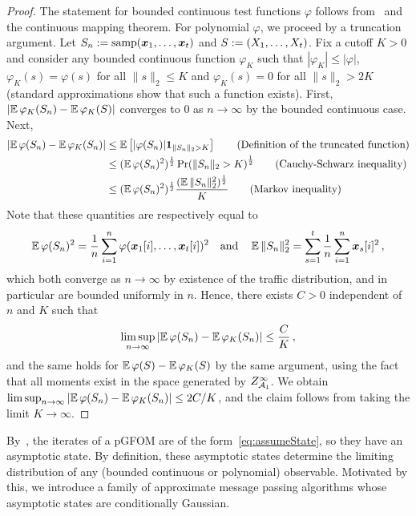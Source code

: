 \begin{proof}
    The statement for bounded continuous test
    functions $\varphi$ follows from~ and
    the continuous mapping theorem.
    For polynomial $\varphi$, we proceed by a truncation argument.
    Let $S_n := \mathrm{samp}(\bm x_1, \ldots, \bm x_t)$ and $S := (X_1, \ldots, X_t)$. Fix a cutoff $K>0$ and consider
    any bounded continuous function $\varphi_K$ such
    that $|\varphi_K|\le |\varphi|$, $\varphi_K(s) = \varphi(s)$ for all
    $\|s\|_2\le K$ and $\varphi_K(s)=0$ for all
    $\|s\|_2>2K$ (standard approximations show that such a function exists). First, $\left|\operatorname*{\mathbb{E}} \varphi_K(S_n)-\operatorname*{\mathbb{E}} \varphi_K(S)\right|$ converges to $0$
    as $n\to\infty$
    by the bounded continuous case. Next,
    \begin{align*}
        \left|\operatorname*{\mathbb{E}} \varphi(S_n) - \operatorname*{\mathbb{E}} \varphi_K(S_n)\right|&\le \operatorname*{\mathbb{E}} \left[|\varphi(S_n)| \mathbf 1_{\|S_n\|_2>K}\right]\tag*{(Definition of the truncated function)}\\
        &\le (\operatorname*{\mathbb{E}} \varphi(S_n)^2)^{\frac 12} \Pr(\|S_n\|_2>K)^{\frac 12}\tag*{(Cauchy-Schwarz inequality)}\\
        &\le (\operatorname*{\mathbb{E}} \varphi(S_n)^2)^{\frac 12} \frac {(\operatorname*{\mathbb{E}} \|S_n\|_2^2)^{\frac 12}} {K}\tag*{(Markov inequality)}
    \end{align*}
    Note that these quantities are respectively equal to
    \[
        \operatorname*{\mathbb{E}} \varphi(S_n)^2 = \frac 1n \sum_{i=1}^n \varphi(\bm x_1[i], \ldots, \bm x_t[i])^2\quad\text{and} \quad\operatorname*{\mathbb{E}} \|S_n\|_2^2 = \sum_{s=1}^t \frac 1n  \sum_{i=1}^n \bm x_s[i]^2\,,
    \]
    which both converge as $n\to\infty$ by existence
    of the traffic distribution, and in particular are bounded uniformly in $n$. Hence, there exists $C>0$ independent of $n$ and $K$ such that
    \[\limsup_{n\to\infty} \left|\operatorname*{\mathbb{E}} \varphi(S_n) - \operatorname*{\mathbb{E}} \varphi_K(S_n)\right|\le \frac C K\,,\] and the
    same holds for $\operatorname*{\mathbb{E}} \varphi(S)-\operatorname*{\mathbb{E}} \varphi_K(S)$ 
    by the same argument, using the fact that all moments exist in the space generated by $Z_{{\cal A}_1}^\infty$. We obtain $\limsup_{n\to\infty} \left|\operatorname*{\mathbb{E}} \varphi(S_n) - \operatorname*{\mathbb{E}} \varphi_K(S_n)\right|\le 2C/K$, and the claim
    follows from taking the limit $K\to\infty$.
\end{proof}



By~, the iterates
of a pGFOM are of the form~\cref{eq:assumeState}, so they have an asymptotic state. By definition, these asymptotic states determine the
limiting distribution of any (bounded continuous or polynomial) observable.
Motivated by this,
we introduce a family of approximate message passing algorithms whose
asymptotic states are conditionally Gaussian.

